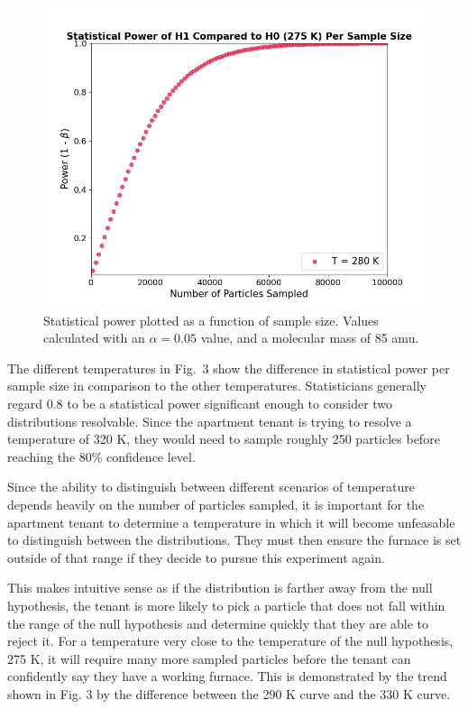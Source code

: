 \documentclass[%
 reprint,
 amsmath,amssymb,
 aps,
]{revtex4-2}
\begin{document}
\begin{figure}[h]
	\caption{Statistical power plotted as a function of sample size. Values calculated with an $\alpha = 0.05$ value, and a molecular mass of 85 amu.}
	\centering
	\includegraphics[scale=0.41]{results1.png}
\end{figure}

The different temperatures in Fig.\ 3 show the difference in statistical power per sample size in comparison to the other temperatures. Statisticians generally regard 0.8 to be a statistical power significant enough to consider two distributions resolvable. Since the apartment tenant is trying to resolve a temperature of 320 K, they would need to sample roughly 250 particles before reaching the 80\% confidence level.

Since the ability to distinguish between different scenarios of temperature depends heavily on the number of particles sampled, it is important for the apartment tenant to determine a temperature in which it will become unfeasable to distinguish between the distributions. They must then ensure the furnace is set outside of that range if they decide to pursue this experiment again. 

This makes intuitive sense as if the distribution is farther away from the null hypothesis, the tenant is more likely to pick a particle that does not fall within the range of the null hypothesis and determine quickly that they are able to reject it. For a temperature very close to the temperature of the null hypothesis, 275 K, it will require many more sampled particles before the tenant can confidently say they have a working furnace. This is demonstrated by the trend shown in Fig. 3 by the difference between the 290 K curve and the 330 K curve. 
\end{document}
